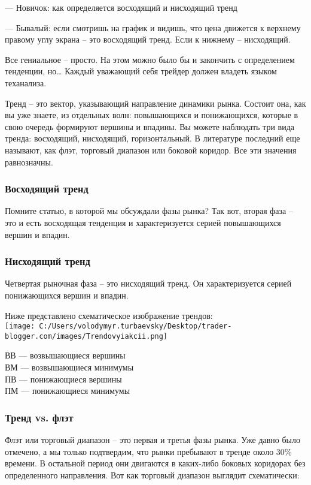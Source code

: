 \documentclass[a5paper]{article}
\begin{document}
—  Новичок: как определяется восходящий и нисходящий тренд

—  Бывалый: если смотришь на график и видишь, что цена движется к верхнему правому углу экрана – это восходящий тренд. Если к нижнему – нисходящий.

Все гениальное – просто. На этом можно было бы и закончить с определением тенденции, но… Каждый уважающий себя трейдер должен владеть языком теханализа.

Тренд – это вектор, указывающий направление динамики рынка. Состоит
она, как вы уже знаете, из отдельных волн: повышающихся и
понижающихся, которые в свою очередь формируют вершины и впадины. Вы
можете наблюдать три вида тренда: восходящий, нисходящий,
горизонтальный. В литературе последний еще называют, как флэт,
торговый диапазон или боковой коридор. Все эти значения равнозначны.

\subsubsection{Восходящий тренд  }

Помните статью, в которой мы обсуждали фазы рынка? Так вот, вторая
фаза – это и есть восходящая тенденция и характеризуется серией
повышающихся вершин и впадин.

\subsubsection{Нисходящий тренд}

Четвертая рыночная фаза – это нисходящий тренд. Он характеризуется серией понижающихся вершин и впадин.

Ниже представлено схематическое изображение трендов:\\

\texttt{[image: C:/Users/volodymyr.turbaevsky/Desktop/trader-blogger.com/images/Trendovyiakcii.png]}

ВВ — возвышающиеся вершины\\
ВМ — возвышающиеся минимумы\\
ПВ — понижающиеся вершины\\
ПМ — понижающиеся минимумы\\

\subsubsection{Тренд vs. флэт}

Флэт или торговый диапазон – это первая и третья фазы рынка. Уже давно
было отмечено, а мы только подтвердим, что рынки пребывают в тренде
около 30\% времени. В остальной период они двигаются в каких-либо
боковых коридорах без определенного направления. Вот как торговый
диапазон выглядит схематически:
\end{document}
